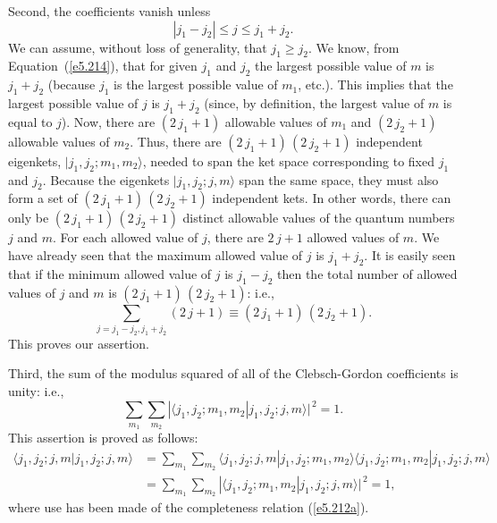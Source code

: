 Second, the coefficients vanish unless
\begin{equation}\label{e5.217}
|j_1-j_2| \leq j \leq j_1+j_2.
\end{equation}
We can assume, without loss of generality, that $j_1\geq j_2$. We know,
from Equation~(\ref{e5.214}), that for given
$j_1$ and $j_2$ the largest possible value of $m$ is $j_1+j_2$ (because 
$j_1$ is the largest possible value of $m_1$, {\rm etc}.). This implies that
the largest possible value of $j$ is $j_1+j_2$ (since, by definition,
the largest value of $m$ is equal to $j$).
Now, there are $(2\,j_1+1)$ allowable values of $m_1$ and $(2\,j_2+1)$ allowable
values of $m_2$. Thus, there are $(2\,j_1+1)\,(2\,j_2+1)$ independent
eigenkets, $|j_1, j_2; m_1, m_2\rangle$, needed to span the ket space
corresponding to fixed $j_1$ and $j_2$. Because the eigenkets
$|j_1, j_2; j, m\rangle$ span the same space, they must also form
a set of  $(2\,j_1+1)\,(2\,j_2+1)$ independent kets. In other words, there
can only be $(2\,j_1+1)\,(2\,j_2+1)$ distinct  allowable values of the quantum numbers
$j$ and $m$. For each allowed value of $j$, there are $2\,j+1$ allowed values
of $m$. We have already seen that the maximum allowed value of $j$ is
$j_1+j_2$. It is easily seen that if the minimum allowed value of
$j$ is $j_1-j_2$ then the total number of allowed values of $j$ and $m$
is  $(2\,j_1+1)\,(2\,j_2+1)$: {\rm i.e.},
\begin{equation}
\sum_{j=j_1-j_2,j_1+j_2} (2\,j+1) \equiv (2\,j_1+1)\,(2\,j_2+1).
\end{equation}
This proves our assertion. 

Third, the sum of the modulus squared of all of the Clebsch-Gordon coefficients
is unity: {\rm i.e.},
\begin{equation}\label{e5.219}
\sum_{m_1}\sum_{m_2} |\langle j_1,j_2;m_1,m_2|j_1,j_2;j,m\rangle|^{\,2} =1.
\end{equation}
This assertion is proved as follows:
\begin{align}
\langle j_1, j_2; j, m| j_1, j_2; j, m\rangle &=\sum_{m_1}\sum_{m_2} \langle j_1, j_2; j, m|j_1, j_2; m_1, m_2\rangle
\langle j_1, j_2; m_1, m_2|j_1, j_2; j, m\rangle\nonumber\\[0.5ex]
&=\sum_{m_1}\sum_{m_2}  |\langle j_1,j_2;m_1,m_2|j_1,j_2;j,m\rangle|^{\,2} =1,
\end{align}
where use has been made of the completeness relation (\ref{e5.212a}).

